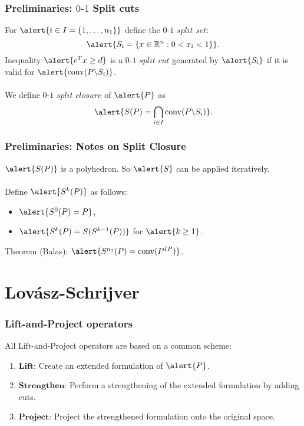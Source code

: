 \documentclass{beamer}
\DeclareMathOperator{\conv}{conv}
\begin{document}
\begin{frame}
\frametitle{Preliminaries: $0$-$1$ Split cuts}
 For $\alert{i \in I = \{1, \dots, n_1\}}$ define the $0$-$1$ $\textit{split set}$:
 $$\alert{S_i = \{x \in \R^n : 0 < x_i < 1\}}.$$
 Inequality $\alert{c^Tx \geq d}$ is a $0$-$1$ $\textit{split cut}$ generated by $\alert{S_i}$ if it is valid for $\alert{\conv(P\backslash S_i)}$.
 \\\ \\
 We define $0$-$1$ $\textit{split closure}$ of $\alert{P}$ as
 $$\alert{S(P) = \bigcap_{i \in I} \conv(P \backslash S_i)}.$$
\end{frame}

\begin{frame}
\frametitle{Preliminaries: Notes on Split Closure}
$\alert{S(P)}$ is a polyhedron. So $\alert{S}$ can be applied iteratively.
\\\ \\
Define $\alert{S^k(P)}$ as follows:
\begin{itemize}
\item $\alert{S^0(P) = P}$,
\item $\alert{S^k(P) = S(S^{k-1}(P))}$ for $\alert{k \geq 1}$.
\end{itemize}
Theorem (Balas): $\alert{S^{n_1}(P) = \conv(P^{IP})}$.
\end{frame}

\section{Lov\'asz-Schrijver}

\begin{frame}
\frametitle{Lift-and-Project operators}
All Lift-and-Project operators are based on a common scheme:
\begin{enumerate}
\item $\textbf{Lift:}$ Create an extended formulation of $\alert{P}$.
\item $\textbf{Strengthen:}$ Perform a strengthening of the extended formulation by adding cuts.
\item $\textbf{Project:}$ Project the strengthened formulation onto the original space.
\end{enumerate}
\end{frame}
\end{document}
